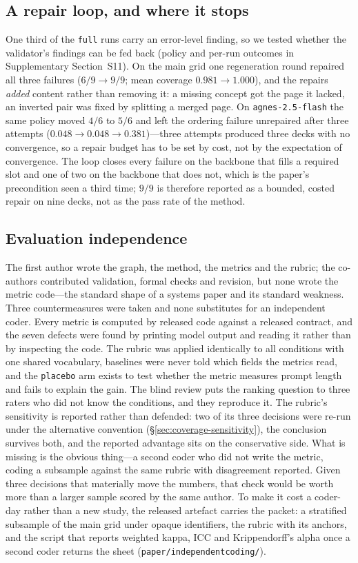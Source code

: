 \documentclass[review,12pt]{elsarticle}
\renewcommand{\_}{\kgunderscore\allowbreak}
\newcommand{\id}[1]{\texttt{#1}}
\begin{document}
\subsection{A repair loop, and where it stops}
\label{sec:repair}

One third of the \id{full} runs carry an error-level finding, so we tested whether
the validator's findings can be fed back (policy and per-run outcomes in
Supplementary Section~S11). On the main grid one regeneration round repaired all
three failures ($6/9\to9/9$; mean coverage $0.981\to1.000$), and the repairs
\emph{added} content rather than removing it: a missing concept got the page it
lacked, an inverted pair was fixed by splitting a merged page. On
\id{agnes-2.5-flash} the same policy moved $4/6$ to $5/6$ and left the ordering
failure unrepaired after three attempts ($0.048\to0.048\to0.381$)---three attempts
produced three decks with no convergence, so a repair budget has to be set by
cost, not by the expectation of convergence. The loop closes every failure
on the backbone that fills a required slot and one of two on the backbone that does
not, which is the paper's precondition seen a third time; $9/9$ is therefore
reported as a bounded, costed repair on nine decks, not as the pass rate of the
method.

\subsection{Evaluation independence}
\label{sec:independence}

The first author wrote the graph, the method, the metrics and the rubric; the
co-authors contributed validation, formal checks and revision, but none wrote the
metric code---the standard shape of a systems paper and its standard weakness.
Three countermeasures were taken and none substitutes for an independent coder.
Every metric is computed by released code against a released contract, and the
seven defects were found by printing model output and reading it rather than by
inspecting the code. The rubric was applied identically to all conditions with
one shared vocabulary, baselines were never told which fields the metrics read,
and the \id{placebo} arm exists to test whether the metric measures prompt
length and fails to explain the gain. The blind review puts the ranking
question to three raters who did not know the conditions, and they reproduce
it. The rubric's sensitivity is reported rather than defended: two of its three
decisions were re-run under the alternative convention
(\S\ref{sec:coverage-sensitivity}), the conclusion survives both, and the
reported advantage sits on the conservative side. What is missing is the
obvious thing---a second coder who did not write the metric, coding a subsample
against the same rubric with disagreement reported. Given three decisions that
materially move the numbers, that check would be worth more than a larger
sample scored by the same author. To make it cost a coder-day rather than a new
study, the released artefact carries the packet: a stratified subsample of the
main grid under opaque identifiers, the rubric with its anchors, and the script
that reports weighted kappa, ICC and Krippendorff's alpha once a second coder
returns the sheet (\id{paper/independent\_coding/}).
\end{document}
